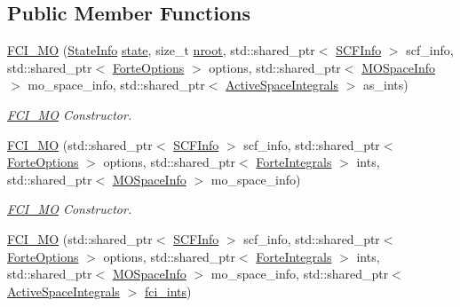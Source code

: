 \subsection*{Public Member Functions}
\begin{DoxyCompactItemize}
\item 
\mbox{\hyperlink{classforte_1_1_f_c_i___m_o_a1fbb0791ddff25cee6d794ed2c0a2717}{F\+C\+I\+\_\+\+MO}} (\mbox{\hyperlink{classforte_1_1_state_info}{State\+Info}} \mbox{\hyperlink{classforte_1_1_active_space_method_a609f005cc7d3a1bc03ae517002eb19dc}{state}}, size\+\_\+t \mbox{\hyperlink{classforte_1_1_active_space_method_aa2bafc732bd7023fd32fbd263ef2e903}{nroot}}, std\+::shared\+\_\+ptr$<$ \mbox{\hyperlink{classforte_1_1_s_c_f_info}{S\+C\+F\+Info}} $>$ scf\+\_\+info, std\+::shared\+\_\+ptr$<$ \mbox{\hyperlink{classforte_1_1_forte_options}{Forte\+Options}} $>$ options, std\+::shared\+\_\+ptr$<$ \mbox{\hyperlink{classforte_1_1_m_o_space_info}{M\+O\+Space\+Info}} $>$ mo\+\_\+space\+\_\+info, std\+::shared\+\_\+ptr$<$ \mbox{\hyperlink{classforte_1_1_active_space_integrals}{Active\+Space\+Integrals}} $>$ as\+\_\+ints)
\begin{DoxyCompactList}\small\item\em \mbox{\hyperlink{classforte_1_1_f_c_i___m_o}{F\+C\+I\+\_\+\+MO}} Constructor. \end{DoxyCompactList}\item 
\mbox{\hyperlink{classforte_1_1_f_c_i___m_o_aa7ee376debece8ddddf96269de04a223}{F\+C\+I\+\_\+\+MO}} (std\+::shared\+\_\+ptr$<$ \mbox{\hyperlink{classforte_1_1_s_c_f_info}{S\+C\+F\+Info}} $>$ scf\+\_\+info, std\+::shared\+\_\+ptr$<$ \mbox{\hyperlink{classforte_1_1_forte_options}{Forte\+Options}} $>$ options, std\+::shared\+\_\+ptr$<$ \mbox{\hyperlink{classforte_1_1_forte_integrals}{Forte\+Integrals}} $>$ ints, std\+::shared\+\_\+ptr$<$ \mbox{\hyperlink{classforte_1_1_m_o_space_info}{M\+O\+Space\+Info}} $>$ mo\+\_\+space\+\_\+info)
\begin{DoxyCompactList}\small\item\em \mbox{\hyperlink{classforte_1_1_f_c_i___m_o}{F\+C\+I\+\_\+\+MO}} Constructor. \end{DoxyCompactList}\item 
\mbox{\hyperlink{classforte_1_1_f_c_i___m_o_a7ccdf79add717a606e97cb0e81f9e1b7}{F\+C\+I\+\_\+\+MO}} (std\+::shared\+\_\+ptr$<$ \mbox{\hyperlink{classforte_1_1_s_c_f_info}{S\+C\+F\+Info}} $>$ scf\+\_\+info, std\+::shared\+\_\+ptr$<$ \mbox{\hyperlink{classforte_1_1_forte_options}{Forte\+Options}} $>$ options, std\+::shared\+\_\+ptr$<$ \mbox{\hyperlink{classforte_1_1_forte_integrals}{Forte\+Integrals}} $>$ ints, std\+::shared\+\_\+ptr$<$ \mbox{\hyperlink{classforte_1_1_m_o_space_info}{M\+O\+Space\+Info}} $>$ mo\+\_\+space\+\_\+info, std\+::shared\+\_\+ptr$<$ \mbox{\hyperlink{classforte_1_1_active_space_integrals}{Active\+Space\+Integrals}} $>$ \mbox{\hyperlink{classforte_1_1_f_c_i___m_o_a69b7bc9ea9616ec11777678f663d6f40}{fci\+\_\+ints}})

\end{DoxyCompactItemize}
